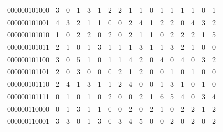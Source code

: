 \documentclass[10pt,a4paper]{article}
\begin{document}
\begin{longtable}{ |c|c|c|c|c|c|c|c|c|c|c|c|c|c|c|c|c| }
    000000101000              & 3                            & 0                                & 1                            & 3                              & 1   & 2   & 2   & 1   & 1   & 0   & 1   & 1   & 1   & 1   & 0   & 1   \\
    000000101001              & 4                            & 3                                & 2                            & 1                              & 1   & 0   & 0   & 2   & 4   & 1   & 2   & 2   & 0   & 4   & 3   & 2   \\
    000000101010              & 1                            & 0                                & 2                            & 2                              & 0   & 2   & 0   & 2   & 1   & 1   & 0   & 2   & 2   & 2   & 1   & 5   \\
    000000101011              & 2                            & 1                                & 0                            & 1                              & 3   & 1   & 1   & 1   & 3   & 1   & 1   & 3   & 2   & 1   & 0   & 0   \\
    000000101100              & 3                            & 0                                & 5                            & 1                              & 0   & 1   & 1   & 4   & 2   & 0   & 4   & 0   & 4   & 0   & 3   & 2   \\
    000000101101              & 2                            & 0                                & 3                            & 0                              & 0   & 0   & 2   & 1   & 2   & 0   & 0   & 1   & 0   & 1   & 0   & 0   \\
    000000101110              & 2                            & 4                                & 1                            & 3                              & 1   & 1   & 2   & 4   & 0   & 0   & 1   & 3   & 1   & 0   & 1   & 0   \\
    000000101111              & 0                            & 1                                & 0                            & 1                              & 0   & 2   & 0   & 0   & 2   & 1   & 6   & 5   & 4   & 0   & 3   & 4   \\
    000000110000              & 0                            & 1                                & 3                            & 1                              & 1   & 0   & 0   & 2   & 0   & 2   & 1   & 0   & 2   & 2   & 1   & 2   \\
    000000110001              & 3                            & 3                                & 0                            & 1                              & 3   & 0   & 3   & 4   & 5   & 0   & 0   & 2   & 0   & 2   & 0   & 2   \\

\end{longtable}
\end{document}
